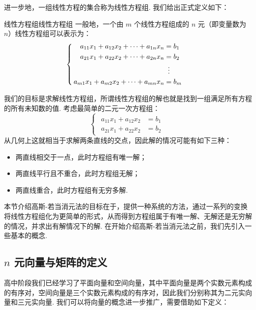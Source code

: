 进一步地，一组线性方程的集合称为线性方程组. 我们给出正式定义如下：

\begin{definition}{线性方程组}{线性方程组}
    一般地，一个由 $m$ 个线性方程组成的 $n$ 元（即变量数为 $n$）线性方程组可以表示为：
    \[ \begin{cases}
        \begin{aligned}
            a_{11}x_1+a_{12}x_2+\cdots+a_{1n}x_n & = b_1 \\
            a_{21}x_1+a_{22}x_2+\cdots+a_{2n}x_n & = b_2 \\
                                                & \vdotswithin{=} \\
            a_{m1}x_1+a_{m2}x_2+\cdots+a_{mn}x_n & = b_m
        \end{aligned}
    \end{cases} \]
\end{definition}

我们的目标是求解线性方程组，所谓线性方程组的解也就是找到一组满足所有方程的所有未知数的值. 考虑最简单的二元一次方程组：
\[ \begin{cases}
    \begin{aligned}
        a_{11}x_1+a_{12}x_2 & = b_1 \\
        a_{21}x_1+a_{22}x_2 & = b_2
    \end{aligned}
\end{cases} \]
从几何上这就相当于求解两条直线的交点，因此解的情况可能有如下三种：
\begin{itemize}
    \item 两直线相交于一点，此时方程组有唯一解；
    \item 两直线平行且不重合，此时方程组无解；
    \item 两直线重合，此时方程组有无穷多解.
\end{itemize}

本节介绍高斯-若当消元法的目标在于，提供一种系统的方法，通过一系列的变换将线性方程组化为更简单的形式，从而得到方程组属于有唯一解、无解还是无穷解的情况，并求出有解情况下的解. 在开始介绍高斯-若当消元法之前，我们先引入一些基本的概念.

\subsection{$n$ 元向量与矩阵的定义}

高中阶段我们已经学习了平面向量和空间向量，其中平面向量是两个实数元素构成的有序对，空间向量是三个实数元素构成的有序对，因此我们分别称其为二元实向量和三元实向量. 我们可以将向量的概念进一步推广，需要借助如下定义：

